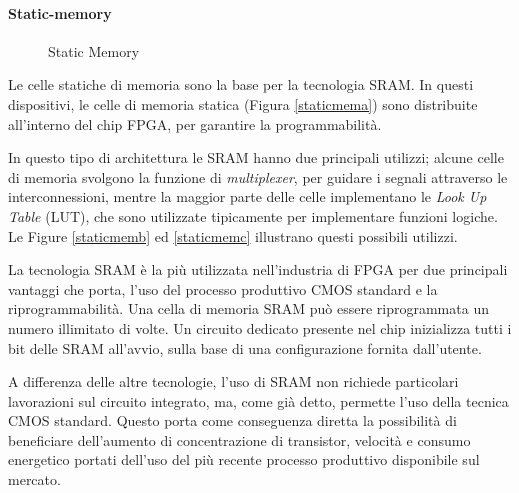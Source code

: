 \paragraph{Static-memory}
\begin{figure}
\centering
{}
\hspace{5mm}
\hspace{5mm}
\caption{Static Memory}\label{staticmem}
\end{figure}
Le celle statiche di memoria sono la base per la tecnologia SRAM. In questi dispositivi, le celle di memoria statica (Figura \ref{staticmema}) sono distribuite all'interno del chip FPGA, per garantire la programmabilità.

In questo tipo di architettura le SRAM hanno due principali utilizzi; alcune celle di memoria svolgono la funzione di \textit{multiplexer}, per guidare i segnali attraverso le interconnessioni, mentre la maggior parte delle celle implementano le \textit{Look Up Table} (LUT), che sono utilizzate tipicamente per implementare funzioni logiche. Le Figure \ref{staticmemb} ed \ref{staticmemc} illustrano questi possibili utilizzi.

La tecnologia SRAM è la più utilizzata nell'industria di FPGA per due principali vantaggi che porta, l'uso del processo produttivo CMOS standard e la riprogrammabilità. Una cella di memoria SRAM può essere riprogrammata un numero illimitato di volte. Un circuito dedicato presente nel chip inizializza tutti i bit delle SRAM all'avvio, sulla base di una configurazione fornita dall'utente.

A differenza delle altre tecnologie, l'uso di SRAM non richiede particolari lavorazioni sul circuito integrato, ma, come già detto, permette l'uso della tecnica CMOS standard. Questo porta come conseguenza diretta la possibilità di beneficiare dell'aumento di concentrazione di transistor, velocità e consumo energetico portati dell'uso del più recente processo produttivo disponibile sul mercato.

